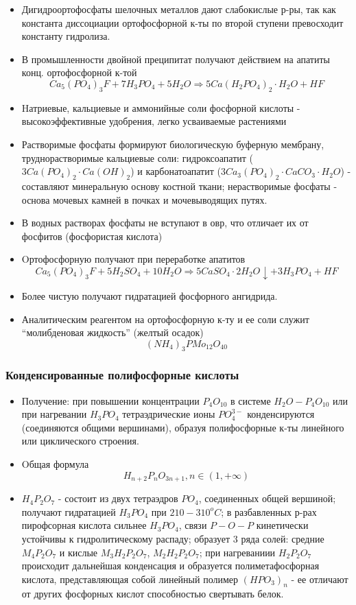 \documentclass[11pt]{article}
\begin{document}
\begin{itemize}
\item  Дигидроортофосфаты шелочных металлов дают слабокислые р-ры, так как константа диссоциации ортофосфорной к-ты по второй ступени превосходит константу гидролиза. 

\item В промышленности двойной преципитат получают действием на апатиты конц. ортофосфорной к-той
 $$Ca_5(PO_4)_3F + 7 H_3PO_4 + 5H_2O \Rightarrow 5Ca(H_2PO_4)_2\cdot H_2O + HF$$

\item Hатриевые, кальциевые и аммонийные соли фосфорной кислоты - высокоэффективные удобрения, легко усваиваемые растениями

\item Растворимые фосфаты формируют биологическую буферную мембрану, труднорастворимые кальциевые соли: гидроксоапатит ($3Ca(PO_4)_2\cdot Ca(OH)_2$) и карбонатоапатит ($3Ca_3(PO_4)_2\cdot CaCO_3\cdot H_2O$) - составляют минеральную основу костной ткани; нерастворимые фосфаты - основа мочевых камней в почках и мочевыводящих путях. 

\item В водных растворах фосфаты не вступают в овр, что отличает их от фосфитов (фосфористая кислота) 
 \item Oртофосфорную получают при переработке апатитов
 $$Ca_5(PO_4)_3F + 5H_2SO_4 +10 H_2O \Rightarrow 5CaSO_4\cdot2H_2O \downarrow + 3H_3PO_4 + HF$$
\item Более чистую получают гидратацией фосфорного ангидрида. 
 \item Аналитическим реагентом на ортофосфорную к-ту и ее соли служит “молибденовая жидкость” (желтый осадок) 
$$(NH_4)_3PMo_{12}O_{40}$$
\end{itemize}

\subsubsection{Конденсированные полифосфорные кислоты}
\begin{itemize}

\item Получение: при повышении концентрации $P_4O_{10}$ в системе $H_2O-P_4O_{10}$ или при нагревании $H_3PO_4$ тетраэдрические ионы $PO_4 ^{3-}$ конденсируются (соединяются общими вершинами), образуя полифосфорные к-ты линейного или циклического строения. 

\item Oбщая формула $$H_{n+2}P_nO_{3n+1}, n \in (1, +\infty)$$

\item $H_4P_2O_7$ - состоит из двух тетраэдров $PO_4$, соединенных общей вершиной; получают гидратацией $H_3PO_4$ при $210-310^oC$; в разбавленных р-рах пирофсорная кислота сильнее $H_3PO_4$, связи $P-O-P$ кинетически устойчивы к гидролитическому распаду; образует 3 ряда солей: средние $M_4P_2O_7$ и кислые $M_3H_2P_2O_7$, $M_2H_2P_2O_7$; при нагреваниии $H_2P_2O_7$ происходит дальнейшая конденсация и образуется полиметафосфорная кислота, представляющая собой линейный полимер $(HPO_3)_n$ - ее отличают от других фосфорных кислот способностью свертывать белок. 
\end{itemize}
\end{document}
